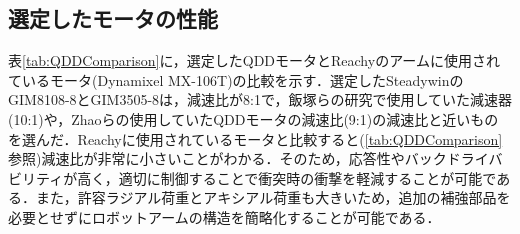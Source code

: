 \subsection{選定したモータの性能}
表\ref{tab:QDDComparison}に，選定したQDDモータとReachy\cite{Reachy:online}のアームに使用されているモータ(Dynamixel MX-106T)の比較を示す．選定したSteadywinのGIM8108-8とGIM3505-8は，減速比が8:1で，飯塚ら\cite{飯塚浩太2021}の研究で使用していた減速器(10:1)や，Zhaoら\cite{10106520}の使用していたQDDモータの減速比(9:1)の減速比と近いものを選んだ．Reachyに使用されているモータと比較すると(\ref{tab:QDDComparison}参照)減速比が非常に小さいことがわかる．そのため，応答性やバックドライバビリティが高く，適切に制御することで衝突時の衝撃を軽減することが可能である．また，許容ラジアル荷重とアキシアル荷重も大きいため，追加の補強部品を必要とせずにロボットアームの構造を簡略化することが可能である．
